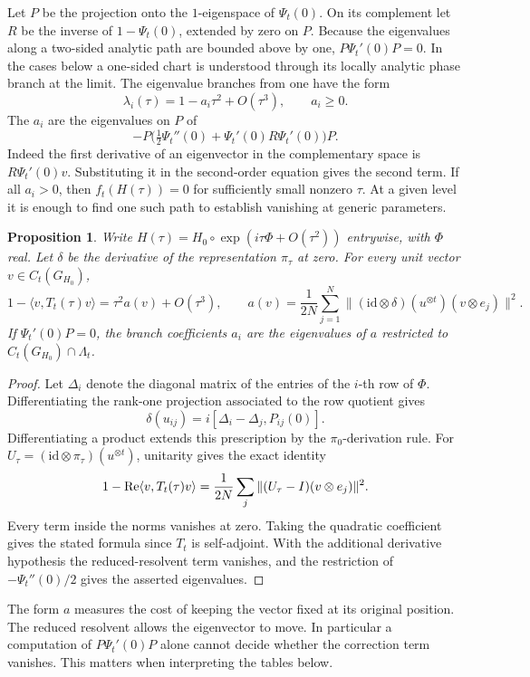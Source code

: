\documentclass[11pt,a4paper]{amsart}
\newtheorem{proposition}[theorem]{Proposition}
\begin{document}
Let $P$ be the projection onto the $1$-eigenspace of $\Psi_t(0)$. On its complement let $R$ be the inverse of $1-\Psi_t(0)$, extended by zero on $P$. Because the eigenvalues along a two-sided analytic path are bounded above by one, $P\Psi_t'(0)P=0$. In the cases below a one-sided chart is understood through its locally analytic phase branch at the limit. The eigenvalue branches from one have the form
\[
 \lambda_i(\tau)=1-a_i\tau^2+O(\tau^3),\qquad a_i\geq0 .
\]
The $a_i$ are the eigenvalues on $P$ of
\[
 -P\big(\tfrac12\Psi_t''(0)+\Psi_t'(0)R\Psi_t'(0)\big)P .
\]
Indeed the first derivative of an eigenvector in the complementary space is $R\Psi_t'(0)v$. Substituting it in the second-order equation gives the second term. If all $a_i>0$, then $f_t(H(\tau))=0$ for sufficiently small nonzero $\tau$. At a given level it is enough to find one such path to establish vanishing at generic parameters.

\begin{proposition}\label{prop:second}
Write $H(\tau)=H_0\circ\exp(i\tau\Phi+O(\tau^2))$ entrywise, with $\Phi$ real. Let $\delta$ be the derivative of the representation $\pi_\tau$ at zero. For every unit vector $v\in C_t(G_{H_0})$,
\[
 1-\langle v,T_t(\tau)v\rangle=\tau^2 a(v)+O(\tau^3),\qquad
 a(v)=\frac1{2N}\sum_{j=1}^N
 \big\|(\mathrm{id}\otimes\delta)(u^{\otimes t})(v\otimes e_j)\big\|^2 .
\]
If $\Psi_t'(0)P=0$, the branch coefficients $a_i$ are the eigenvalues of $a$ restricted to $C_t(G_{H_0})\cap\Lambda_t$.
\end{proposition}
\begin{proof}
Let $\Delta_i$ denote the diagonal matrix of the entries of the $i$-th row of $\Phi$. Differentiating the rank-one projection associated to the row quotient gives
\[
 \delta(u_{ij})=i[\Delta_i-\Delta_j,P_{ij}(0)] .
\]
Differentiating a product extends this prescription by the $\pi_0$-derivation rule. For $U_\tau=(\mathrm{id}\otimes\pi_\tau)(u^{\otimes t})$, unitarity gives the exact identity
\[
 1-\mathop{\rm Re}\langle v,T_t(\tau)v\rangle
  =\frac1{2N}\sum_j\|(U_\tau-I)(v\otimes e_j)\|^2 .
\]
Every term inside the norms vanishes at zero. Taking the quadratic coefficient gives the stated formula since $T_t$ is self-adjoint. With the additional derivative hypothesis the reduced-resolvent term vanishes, and the restriction of $-\Psi_t''(0)/2$ gives the asserted eigenvalues.
\end{proof}

The form $a$ measures the cost of keeping the vector fixed at its original position. The reduced resolvent allows the eigenvector to move. In particular a computation of $P\Psi_t'(0)P$ alone cannot decide whether the correction term vanishes. This matters when interpreting the tables below.
\end{document}
